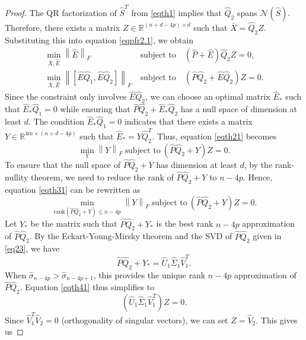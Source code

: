 \documentclass[preprint,11pt,3p]{elsarticle}
\newcommand\norm[1]{\left\lVert#1\right\rVert}
\def \rank{\mathrm{rank}}
\begin{document}
\begin{proof}
	The QR factorization of $\hat{S}^T$ from \eqref{eqth1} implies that $\hat{Q}_2$ spans $\mathcal{N}(\hat{S})$. Therefore, there exists a matrix $Z \in \mathbb{R}^{(n+d-4p) \times d}$ such that $\bar{X} = \hat{Q}_2 Z$. Substituting this into equation \eqref{eqpfr2.1}, we obtain
		\begin{eqnarray}
		\min_{ \bar{X}, \hat{E}} \norm{\hat{E}}_F ~ &\textrm{subject to}& ~ \left(\hat{P}+\hat{E}\right)\hat{Q}_2Z = 0, \nonumber \\
		\min_{ \bar{X}, \hat{E}} \norm{\left[\hat{E}\hat{Q}_1, \hat{E}\hat{Q}_2\right]}_F ~ &\textrm{subject to}& ~ \left(\hat{P}\hat{Q}_2+\hat{E}\hat{Q}_2\right)Z = 0. \label{eqth21}
	\end{eqnarray}
Since the constraint only involves $\hat{E}\hat{Q}_2$, we can choose an optimal matrix $\hat{E}_{*}$ such that $\hat{E}_{*}\hat{Q}_1 = 0$ while ensuring that $\hat{P}\hat{Q}_2 + \hat{E}_{*}\hat{Q}_2$ has a null space of dimension at least $d$. The condition $\hat{E}_{*}\hat{Q}_1 = 0$ indicates that there exists a matrix $Y \in \mathbb{R}^{4m \times (n+d-4p)}$ such that $\hat{E}_{*} = Y\hat{Q}_{2}^T$. Thus, equation \eqref{eqth21} becomes
	\begin{equation}\label{eqth31}
		\min_{Y}\norm{Y}_F ~ \textrm{subject to} ~ \left(\hat{P}\hat{Q}_2+Y\right)Z=0.
	\end{equation}
To ensure that the null space of $\hat{P}\hat{Q}_2+Y$ has dimension at least $d$, by the rank-nullity theorem, we need to reduce the rank of $\hat{P}\hat{Q}_2+Y$ to $n-4p$. Hence, equation \eqref{eqth31} can be rewritten as
	\begin{equation}\label{eqth41}
		\min_{\rank(\hat{P}\hat{Q}_2 +Y) \leq n-4p}\norm{Y}_F ~ \textrm{subject to} ~ \left(\hat{P}\hat{Q}_2+Y\right)Z=0.
	\end{equation}
Let $Y_{*}$ be the matrix such that $\hat{P}\hat{Q}_2+Y_{*}$ is the best rank $n-4p$ approximation of $\hat{P}\hat{Q}_2$. By the Eckart-Young-Mirsky theorem and the SVD of $\hat{P}\hat{Q}_2$ given in \eqref{eq23}, we have
\begin{equation*}
	\hat{P}\hat{Q}_2+Y_{*} = \hat{U}_1 \hat{\Sigma}_1\hat{V}_1^T.
\end{equation*}
When $\hat{\sigma}_{n-4p} > \hat{\sigma}_{n-4p+1}$, this provides the unique rank $n-4p$ approximation of $\hat{P}\hat{Q}_2$. Equation \eqref{eqth41} thus simplifies to
\begin{equation*}
		\left(\hat{U}_1 \hat{\Sigma}_1\hat{V}_1^T\right)Z=0.
	\end{equation*}	
Since $\hat{V}_1^T\hat{V}_2=0$ (orthogonality of singular vectors), we can set $Z=\hat{V}_2$. This gives us

\end{proof}
\end{document}
